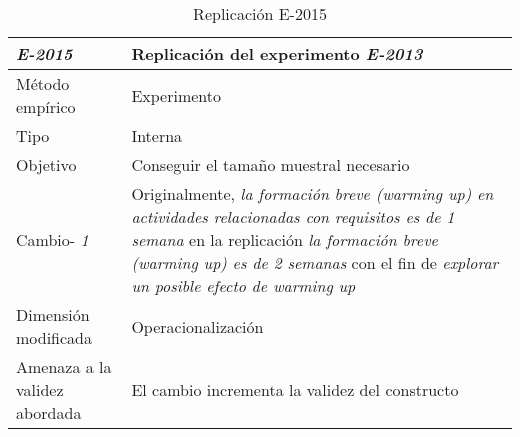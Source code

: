 
\begin{table}
\caption{Replicación E-2015}
\begin{tabular}{| p{3.3cm} | p{9cm} |}
\hline

\textbf {\textit{E-2015}} & Replicación del experimento \textit{E-2013 }    \\  \hline

Método empírico &  Experimento   \\  \hline
Tipo &  Interna   \\  \hline
Objetivo  &  Conseguir el tamaño muestral necesario \\  \hline \hline
 
Cambio- \textit{1}   & \parbox[t]{9cm} {Originalmente,  \textit{ la formación breve (warming up) en actividades relacionadas con requisitos es de 1 semana} } \parbox[t]{9cm}{en la replicación \textit{ la formación breve (warming up) es de 2 semanas} }  con el fin de \textit{explorar un posible efecto de warming up } \\  \hline
Dimensión modificada & 
Operacionalización \\  \hline 
Amenaza a la validez abordada  & El cambio incrementa la validez del constructo  \\  \hline
 \hline

\end{tabular}
\label{tab:plantilla}
\end{table}





